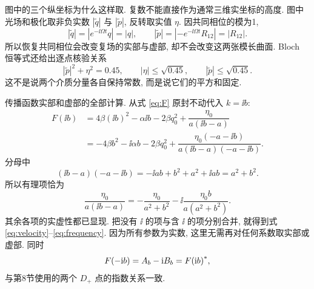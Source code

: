 \par\smallskip\noindent 图中的三个纵坐标为什么这样取.\quad
复数不能直接作为通常三维实坐标的高度. 图中光场和极化取非负实数 $|\widetilde q|$ 与 $|\widetilde p|$, 反转取实值 $\eta$. 因共同相位的模为1,
\begin{equation*}
|\widetilde q|=|e^{-\ii\Omega t}q|=|q|,\qquad
|\widetilde p|=|-e^{-\ii\Omega t}R_{12}|=|R_{12}|.
\end{equation*}
所以恢复共同相位会改变复场的实部与虚部, 却不会改变这两张模长曲面. Bloch 恒等式还给出逐点核验关系
\begin{equation*}
|\widetilde p|^2+\eta^2=0.45,
\qquad |\eta|\le\sqrt{0.45},\qquad
|\widetilde p|\le\sqrt{0.45}.
\end{equation*}
这不是说两个介质分量各自保持常数, 而是说它们的平方和固定.

\par\smallskip\noindent 传播函数实部和虚部的全部计算.\quad
从式 \eqref{eq:F} 原封不动代入 $k=\ii b$:
\begin{align*}
F(\ii b)
&=4\beta(\ii b)^2-\alpha\ii b-2\beta q_0^2
+\dfrac{\eta_0}{a(\ii b-a)}\\
&=-4\beta b^2-\ii\alpha b-2\beta q_0^2
+\dfrac{\eta_0(-a-\ii b)}{a(\ii b-a)(-a-\ii b)}.
\end{align*}
分母中
\begin{equation*}
(\ii b-a)(-a-\ii b)
=-\ii ab+b^2+a^2+\ii ab=a^2+b^2.
\end{equation*}
所以有理项恰为
\begin{equation*}
\dfrac{\eta_0}{a(\ii b-a)}
=-\dfrac{\eta_0}{a^2+b^2}
-\ii\dfrac{\eta_0b}{a(a^2+b^2)}.
\end{equation*}
其余各项的实虚性都已显现. 把没有 $\ii$ 的项与含 $\ii$ 的项分别合并, 就得到式 \eqref{eq:velocity}--\eqref{eq:frequency}. 因为所有参数为实数, 这里无需再对任何系数取实部或虚部. 同时
\begin{equation*}
F(-\mathrm{i} b)=A_b-\mathrm{i} B_b={F(\mathrm{i} b)}^{*},
\end{equation*}
与第8节使用的两个 $D_+$ 点的指数关系一致.


